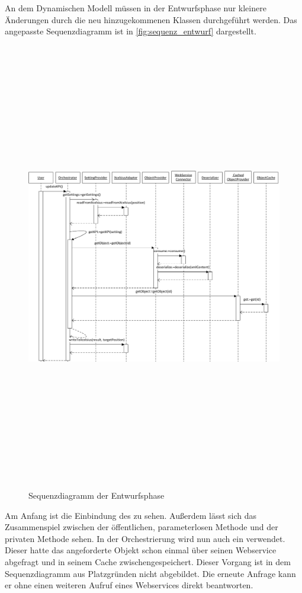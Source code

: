 \begin{onehalfspacing}
An dem Dynamischen Modell müssen in der Entwurfsphase nur kleinere Änderungen durch die neu hinzugekommenen Klassen durchgeführt werden. Das angepasste Sequenzdiagramm ist in \vref{fig:sequenz_entwurf} dargestellt.

\begin{figure}[!ht]
\centering
\setlength{\unitlength}{1mm}
\includegraphics[angle=90,height=197mm]{Visio/Entwurf-Sequenz.pdf}
\caption{Sequenzdiagramm der Entwurfsphase\label{fig:sequenz_entwurf}}
\end{figure}

Am Anfang ist die Einbindung des  zu sehen. Außerdem lässt sich das Zusammenspiel zwischen der öffentlichen, parameterlosen Methode  und der privaten Methode  sehen. In der Orchestrierung wird nun auch ein  verwendet. Dieser hatte das angeforderte Objekt schon einmal über seinen Webservice abgefragt und in seinem Cache zwischengespeichert. Dieser Vorgang ist in dem Sequenzdiagramm aus Platzgründen nicht abgebildet. Die erneute Anfrage kann er ohne einen weiteren Aufruf eines Webservices direkt beantworten.


\end{onehalfspacing}
